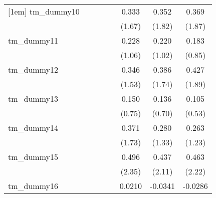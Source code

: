 {\begin{tabular}{l*{7}{c}}
[1em]
tm\_dummy10  &                     &                     &                     &                     &       0.333         &       0.352         &       0.369         \\
            &                     &                     &                     &                     &      (1.67)         &      (1.82)         &      (1.87)         \\
[1em]
tm\_dummy11  &                     &                     &                     &                     &       0.228         &       0.220         &       0.183         \\
            &                     &                     &                     &                     &      (1.06)         &      (1.02)         &      (0.85)         \\
[1em]
tm\_dummy12  &                     &                     &                     &                     &       0.346         &       0.386         &       0.427         \\
            &                     &                     &                     &                     &      (1.53)         &      (1.74)         &      (1.89)         \\
[1em]
tm\_dummy13  &                     &                     &                     &                     &       0.150         &       0.136         &       0.105         \\
            &                     &                     &                     &                     &      (0.75)         &      (0.70)         &      (0.53)         \\
[1em]
tm\_dummy14  &                     &                     &                     &                     &       0.371         &       0.280         &       0.263         \\
            &                     &                     &                     &                     &      (1.73)         &      (1.33)         &      (1.23)         \\
[1em]
tm\_dummy15  &                     &                     &                     &                     &       0.496\sym{*}  &       0.437\sym{*}  &       0.463\sym{*}  \\
            &                     &                     &                     &                     &      (2.35)         &      (2.11)         &      (2.22)         \\
[1em]
tm\_dummy16  &                     &                     &                     &                     &      0.0210         &     -0.0341         &     -0.0286         \\

\end{tabular}}

